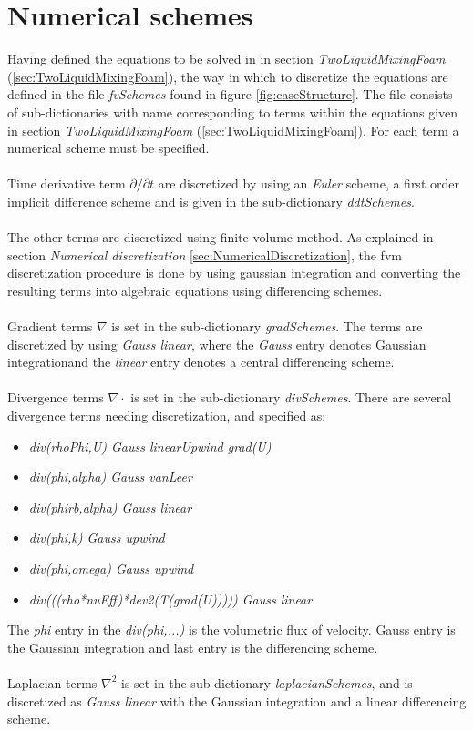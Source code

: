 \documentclass[a4paper, 12pt]{report}
\begin{document}
\section{Numerical schemes}
Having defined the equations to be solved in in section \textit{TwoLiquidMixingFoam} (\ref{sec:TwoLiquidMixingFoam}), the way in which to discretize the equations are defined in the file \textit{fvSchemes} found in figure \ref{fig:caseStructure}. The file consists of sub-dictionaries with name corresponding to terms within the equations given in section \textit{TwoLiquidMixingFoam} (\ref{sec:TwoLiquidMixingFoam}). For each term a numerical scheme must be specified.\\
\\
Time derivative term $\partial / \partial t$ are discretized by using an \textit{Euler} scheme, a first order implicit difference scheme and is given in the sub-dictionary \textit{ddtSchemes}.\\
\\
The other terms are discretized using finite volume method. As explained in section \textit{Numerical discretization} \ref{sec:NumericalDiscretization}, the fvm discretization procedure is done by using gaussian integration and converting the resulting terms into algebraic equations using differencing schemes.\\
\\
Gradient terms $\nabla$ is set in the sub-dictionary \textit{gradSchemes}. The terms are discretized by using \textit{Gauss linear}, where the \textit{Gauss} entry denotes Gaussian integrationand the \textit{linear} entry denotes a central differencing scheme.\\
\\
Divergence terms $\nabla \cdot$ is set in the sub-dictionary \textit{divSchemes}. There are several divergence terms needing discretization, and specified as:
\begin{itemize}
\item \textit{div(rhoPhi,U) Gauss linearUpwind grad(U)}
\item \textit{div(phi,alpha) Gauss vanLeer}
\item \textit{div(phirb,alpha) Gauss linear}
\item \textit{div(phi,k) Gauss upwind}
\item \textit{div(phi,omega) Gauss upwind}
\item \textit{div(((rho*nuEff)*dev2(T(grad(U))))) Gauss linear}
\end{itemize}
The \textit{phi} entry in the \textit{div(phi,...)} is the volumetric flux of velocity. Gauss entry is the Gaussian integration and last entry is the differencing scheme.\\
\\
Laplacian terms $\nabla^2$ is set in the sub-dictionary \textit{laplacianSchemes}, and is discretized as \textit{Gauss linear} with the Gaussian integration and a linear differencing scheme.
\end{document}
